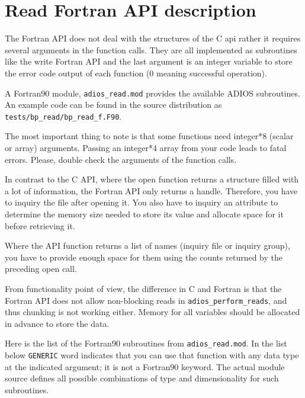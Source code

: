 \section{Read Fortran API description}
\label{section:read_fortran_api}

The Fortran API does not deal with the structures of the C api rather it requires 
several arguments in the function calls.  They are all implemented as subroutines 
like the write Fortran API and the last argument is an integer variable to store 
the error code output of each function (0 meaning successful operation). 

A Fortran90 module, \verb+adios_read.mod+ provides the available ADIOS subroutines. 
An example code can be found in the source distribution as 
\verb+tests/bp_read/bp_read_f.F90+.

The most important thing to note is that some functions need integer*8 (scalar 
or array) arguments. Passing an integer*4 array from your code leads to fatal errors. 
Please, double check the arguments of the function calls. 

In contrast to the C API, where the open function returns a structure filled with 
a lot of information, the Fortran API only returns a handle. Therefore, 
you have to inquiry the file after opening it.
You also have to inquiry an attribute to determine the memory 
size needed to store its value and allocate space for it before retrieving it. 

Where the API function returns a list of names (inquiry file or inquiry group), 
you have to provide enough space for them using the counts returned by the preceding 
open call. 

From functionality point of view, the difference in C and Fortran is that the 
Fortran API does not allow non-blocking reads in \verb+adios_perform_reads+, and thus
chunking is not working either. Memory for all variables should be allocated in advance 
to store the data.

Here is the list of the Fortran90 subroutines from \verb+adios_read.mod+. 
In the list below \verb+GENERIC+ word indicates that you 
can use that function with any data type at the indicated argument; it is not
a Fortran90 keyword. The actual module source defines all possible combinations 
of type and dimensionality for such subroutines. 

